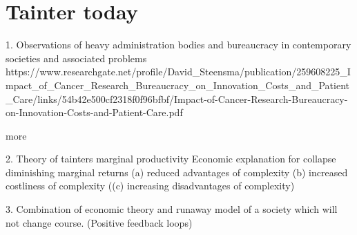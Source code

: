 
\section{Tainter today}

%
%
%

1. Observations of heavy administration bodies and bureaucracy in contemporary societies and associated problems
https://www.researchgate.net/profile/David_Steensma/publication/259608225_Impact_of_Cancer_Research_Bureaucracy_on_Innovation_Costs_and_Patient_Care/links/54b42e500cf2318f0f96bfbf/Impact-of-Cancer-Research-Bureaucracy-on-Innovation-Costs-and-Patient-Care.pdf

more


2. Theory of tainters marginal productivity
Economic explanation for collapse
diminishing marginal returns
(a) reduced advantages of complexity
(b) increased costliness of complexity
((c) increasing disadvantages of complexity)



3. Combination of economic theory and runaway model of a society which will not change course. (Positive feedback loops)
